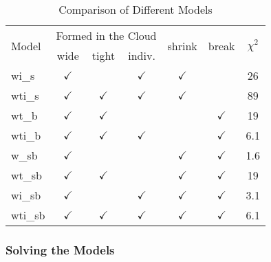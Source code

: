 \documentclass[usenatbib,a4paper]{mnras}
\begin{document}
\begin{table}
\begin{threeparttable}
\caption{Comparison of Different Models}\label{modelTable}
\begin{tabular}{lcccccc}%
\hline\hline
\multirow{2}{*}{Model} 	&  \multicolumn{3}{c}{Formed in the Cloud}	&  \multirow{2}{*}{shrink} & \multirow{2}{*}{break} & \multirow{2}{*}{$\chi^2$}  \\								%
		&  wide	     	   & tight	         	& indiv.	      	   &		       		&	 			& \\
\hline
wi\_s		& $\checkmark$  & 		         	& $\checkmark$   & $\checkmark$  	& 				& 26 \\ %
wti\_s	& $\checkmark$  & $\checkmark$     & $\checkmark$   & $\checkmark$  	& 				& 89 \\ %
wt\_b	& $\checkmark$  &$\checkmark$  	&			   &		       		& $\checkmark$  	& 19\\ %
wti\_b	& $\checkmark$  & $\checkmark$  	& $\checkmark$  &		        		& $\checkmark$  	& 6.1 \\ %
w\_sb	& $\checkmark$  &		         	&			   & $\checkmark$  	& $\checkmark$  	& 1.6 \\ %
wt\_sb	& $\checkmark$  & $\checkmark$  	&			   & $\checkmark$  	& $\checkmark$  	& 19 \\ %
wi\_sb 	& $\checkmark$  & 		         	& $\checkmark$  & $\checkmark$  	& $\checkmark$ 	& 3.1 \\ %
wti\_sb	& $\checkmark$  & $\checkmark$  	& $\checkmark$  & $\checkmark$  	& $\checkmark$  	& 6.1 \\ %
\hline
\end{tabular}
\end{threeparttable}
\end{table}

\subsubsection{Solving the Models}\label{sfr}
\end{document}
